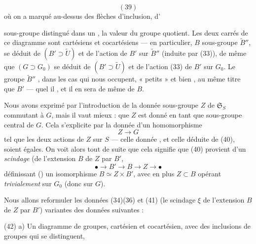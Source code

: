 \documentclass[11pt,a4paper]{article}
\begin{document}
\[
(39)
\]
où on a marqué au-dessus des flèches d'inclusion, d'

 sous-groupe distingué dans un  , la valeur du groupe quotient. Les deux carrés de ce diagramme sont cartésiens et cocartésiens — en particulier, $B$    sous-groupe \struck{\ill{}}  $\tilde{B}''$, se déduit de $(B'\supset\tilde{U})$ et de l'action de $B'$ sur $\tilde{B}''$ (induite par (33)), de même que $(G\supset G_0)$ se déduit de $(B'\supset\tilde{U})$ et de l'action (33) de $B'$ sur $G_0$. Le groupe $\tilde{B}''$ \struck{\ill{}} , dans les cas qui nous occupent,  « petits » et bien , au même titre que $B'$ — quel \ill{} il  \ill{} , et il en sera de même de $B$.

Nous avons exprimé par l'introduction  de la donnée \ill{} sous-groupe $Z$ de $\mathfrak{S}_S$ commutant à $G$, mais il vaut mieux :  que $Z$ est donné en tant que sous-groupe central de $G$. Cela s'explicite par la donnée d'un homomorphisme \struck{\ill{}}
\[
Z\longrightarrow G \tag{40}
\]
tel que les deux actions de $Z$ sur $S$ — celle donnée , et celle déduite de (40), soient égales. On voit alors tout de suite que cela signifie que (40) provient d'un \emph{scindage} (de l'extension $B$ de $Z$ par $B'$, \struck{\ill{}}
\[
\bullet\longrightarrow B'\longrightarrow B\longrightarrow Z\longrightarrow\bullet \tag{41}
\]
définissant () un isomorphisme $B\simeq Z\times B'$, avec en plus $Z\subset B$ opérant \emph{trivialement} sur $G_0$ (donc sur $G$).

Nous allons reformuler les données (34)(36) et (41) (le scindage $\xi$ de l'extension $B$ de $Z$ par $B'$)    variantes   des données suivantes :

(42) a) Un diagramme  de groupes, cartésien et cocartésien, avec des inclusions de groupes qui se distinguent,

\end{document}
